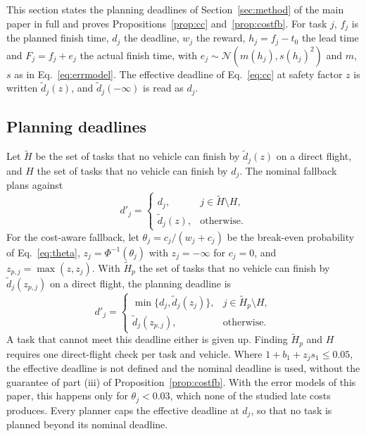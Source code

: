 This section states the planning deadlines of Section~\ref{sec:method} of the main paper in full and proves
Propositions~\ref{prop:cc} and~\ref{prop:costfb}. For task $j$, $f_j$ is the planned finish time, $d_j$ the deadline,
$w_j$ the reward, $h_j=f_j-t_0$ the lead time and $F_j=f_j+e_j$ the actual finish time, with
$e_j\sim\mathcal{N}(m(h_j),s(h_j)^2)$ and $m$, $s$ as in Eq.~\eqref{eq:errmodel}. The effective deadline of
Eq.~\eqref{eq:cc} at safety factor $z$ is written $\tilde d_j(z)$, and $\tilde d_j(-\infty)$ is read as $d_j$.

\subsection{Planning deadlines}
Let $\tilde H$ be the set of tasks that no vehicle can finish by $\tilde d_j(z)$ on a direct flight, and $H$ the set of
tasks that no vehicle can finish by $d_j$. The nominal fallback plans against
\begin{equation}\label{eq:Sfallback}
d'_j=\begin{cases} d_j, & j\in\tilde H\setminus H,\\ \tilde d_j(z), & \text{otherwise.}\end{cases}
\end{equation}
For the cost-aware fallback, let $\theta_j=c_j/(w_j+c_j)$ be the break-even probability of Eq.~\eqref{eq:theta},
$z_j=\Phi^{-1}(\theta_j)$ with $z_j=-\infty$ for $c_j=0$, and $z_{p,j}=\max(z,z_j)$. With $\tilde H_p$ the set of tasks
that no vehicle can finish by $\tilde d_j(z_{p,j})$ on a direct flight, the planning deadline is
\begin{equation}\label{eq:Scostfb}
d'_j=\begin{cases} \min\{d_j,\tilde d_j(z_j)\}, & j\in\tilde H_p\setminus H,\\ \tilde d_j(z_{p,j}), &
\text{otherwise.}\end{cases}
\end{equation}
A task that cannot meet this deadline either is given up. Finding $\tilde H_p$ and $H$ requires one direct-flight check
per task and vehicle. Where $1+b_1+z_js_1\le0.05$, the effective deadline is not defined and the nominal deadline is
used, without the guarantee of part (iii) of Proposition~\ref{prop:costfb}. With the error models of this paper, this
happens only for $\theta_j<0.03$, which none of the studied late costs produces. Every planner caps the effective deadline
at $d_j$, so that no task is planned beyond its nominal deadline.

